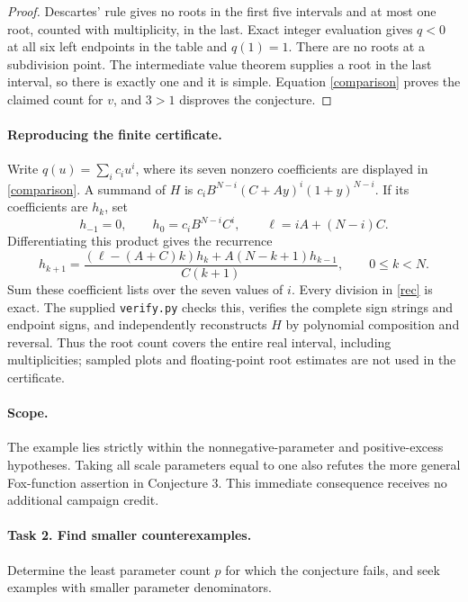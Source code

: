 \documentclass[10pt]{article}
\begin{document}
\begin{proof}
Descartes' rule gives no roots in the first five intervals and
at most one root, counted with multiplicity, in the last.
Exact integer evaluation gives \(q<0\) at all six left endpoints
in the table and \(q(1)=1\). There are no roots at a subdivision
point. The intermediate value theorem supplies a root in the
last interval, so there is exactly one and it is simple.
Equation \eqref{comparison} proves the claimed count for \(v\),
and \(3>1\) disproves the conjecture.
\end{proof}

\paragraph{Reproducing the finite certificate.}
Write \(q(u)=\sum_i c_i u^i\), where its seven nonzero coefficients
are displayed in \eqref{comparison}. A summand of \(H\) is
\(c_i B^{N-i}(C+Ay)^i(1+y)^{N-i}\).
If its coefficients are \(h_k\), set
\[
 h_{-1}=0,\qquad h_0=c_i B^{N-i}C^i,\qquad
 \ell=iA+(N-i)C.
\]
Differentiating this product gives the recurrence
\begin{equation}\label{rec}
 h_{k+1}=\frac{(\ell-(A+C)k)h_k+A(N-k+1)h_{k-1}}{C(k+1)},
 \qquad 0\le k<N.
\end{equation}
Sum these coefficient lists over the seven values of \(i\).
Every division in \eqref{rec} is exact. The supplied
\texttt{verify.py} checks this, verifies the complete sign strings
and endpoint signs, and independently reconstructs \(H\) by
polynomial composition and reversal. Thus the root count covers
the entire real interval, including multiplicities; sampled plots
and floating-point root estimates are not used in the certificate.

\paragraph{Scope.}
The example lies strictly within the nonnegative-parameter and
positive-excess hypotheses. Taking all scale parameters equal
to one also refutes the more general Fox-function assertion
in Conjecture 3. This immediate consequence receives no additional
campaign credit.

\paragraph{Task 2. Find smaller counterexamples.}
Determine the least parameter count \(p\) for which the conjecture
fails, and seek examples with smaller parameter denominators.
\end{document}
